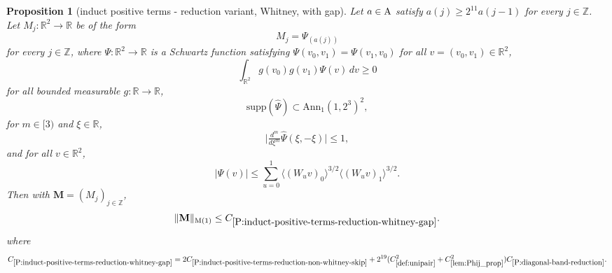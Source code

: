 \documentclass[12pt,reqno]{amsart}
\theoremstyle{plain}
\newtheorem{proposition}[theorem]{Proposition}
\numberwithin{equation}{section}
\theoremstyle{remark}
\newcommand{\uses}[1]{}
\newcommand{\usesdefs}[1]{}
\newcommand{\Z}{{\mathbb Z}}
\newcommand{\R}{{\mathbb R}}
\newcommand{\M}{\mathbf{M}}
\begin{document}
\begin{proposition}[induct positive terms - reduction variant, Whitney, with gap]
\label{P:induct-positive-terms-reduction-whitney-gap}\uses{lem:Phij_prop,lem:form_pos,P:induct-positive-terms-reduction-non-whitney-skip,P:vanishing-diagonal-reduction,lem:smoothdecay2,lem:scaleest,P:diagonal-band-reduction}\usesdefs{bracket bump,normalized function tuples,auto:prism-form-definition,multiplicatively spaced monotone sequences,auto:unitary-matrices-definition,kernel sequences,def:cn-window,def:unipair}
Let $a\in {\rm A}$ satisfy $a(j)\geq 2^{11}a(j-1)$ for every $j\in\mathbb Z$. Let $M_j:\mathbb{R}^2\to \mathbb{R}$ be of the form
\begin{equation}\label{auto:Whitney-gap-kernel}
M_j=\Psi_{(a(j))}
\end{equation}
for every $j\in\Z$, where $\Psi:\mathbb{R}^2\to \mathbb{R}$ is a Schwartz function satisfying $\Psi(v_0,v_1)=\Psi(v_1,v_0)$ for all $v=(v_0,v_1)\in\mathbb{R}^2$,
\begin{equation}\label{p1-on-W_pos}
\int_{\mathbb{R}^2} g(v_0){g(v_1)}\Psi(v)\,dv\ge 0
\end{equation}
for all bounded measurable $g:\mathbb{R}\to\mathbb{R}$,
\begin{equation}\label{p1-on-W_supp}
\mathrm{supp}(\widehat{\Psi}) \subset \mathrm{Ann}_1(1, 2^3)^2,
\end{equation}
for $m\in [3)$ and $\xi \in \R$,
\begin{equation}\label{p1-on-W_der}
\Big|\tfrac{d^m}{d\xi^{m}} \widehat{\Psi}(\xi,-\xi)\Big| \leq 1,
\end{equation}
and for all $v\in\mathbb{R}^2$,
\begin{equation}\label{p1-on-W_decay}
|\Psi(v)| \le \sum_{u=0}^1 \langle(W_u v)_0\rangle^{3/2} \langle (W_u v)_1\rangle^{3/2}.
\end{equation}
Then with $\M=(M_j)_{j\in\Z}$,
\begin{equation}\label{auto:Whitney-gap-reduction-bound}
\|\M\|_{\rm M(1)} \le C_{\ref{P:induct-positive-terms-reduction-whitney-gap}}.
\end{equation}
where
\begin{equation}\label{auto:Whitney-gap-constant-definition}
C_{\ref{P:induct-positive-terms-reduction-whitney-gap}}
=2C_{\ref{P:induct-positive-terms-reduction-non-whitney-skip}}
+2^{19}(C_{\ref{def:unipair}}^2+C_{\ref{lem:Phij_prop}}^2)C_{\ref{P:diagonal-band-reduction}}.
\end{equation}
\end{proposition}
\end{document}
